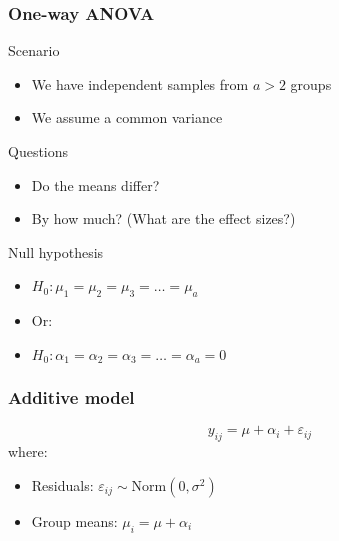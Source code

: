 \documentclass[color=usenames,dvipsnames]{beamer}\usepackage[]{graphicx}\usepackage[]{color}
\begin{document}
\begin{frame}
  \frametitle{One-way ANOVA}
  {\Large Scenario}
  \begin{itemize}
    \item We have independent samples from $a>2$ groups
    \item We assume a common variance
  \end{itemize}
  \pause
  \vfill
  {\Large Questions}
  \begin{itemize}
    \item Do the means differ?
    \item By how much? (What are the effect sizes?)
  \end{itemize}
  \pause
  \vfill
  {\Large Null hypothesis}
  \begin{itemize}
    \item $H_0: \mu_1 = \mu_2 = \mu_3 = \ldots = \mu_a$
    \item Or:
    \item $H_0: \alpha_1 = \alpha_2 = \alpha_3 = \ldots = \alpha_a = 0$
  \end{itemize}
\end{frame}





\begin{frame}
  \frametitle{Additive model}
  \Large
  \[
    y_{ij} = \mu + \alpha_i + \varepsilon_{ij}
  \]
  \large
  \vfill
  where:
  \begin{itemize}
    \item Residuals: $\varepsilon_{ij} \sim \mathrm{Norm}(0, \sigma^2)$
    \item Group means: $\mu_i = \mu + \alpha_i$
  \end{itemize}
\end{frame}




\end{document}
